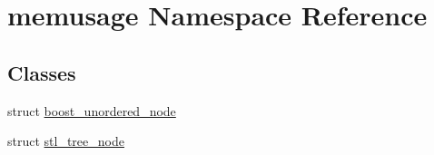 \hypertarget{namespacememusage}{}\section{memusage Namespace Reference}
\label{namespacememusage}
\subsection*{Classes}
\begin{DoxyCompactItemize}
\item 
struct \mbox{\hyperlink{structmemusage_1_1boost__unordered__node}{boost\+\_\+unordered\+\_\+node}}
\item 
struct \mbox{\hyperlink{structmemusage_1_1stl__tree__node}{stl\+\_\+tree\+\_\+node}}
\end{DoxyCompactItemize}
